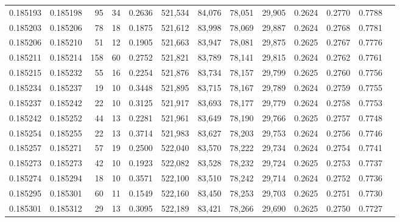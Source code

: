 \begin{tabular}{rrrrrrrrrrrrr}
0.185193 & 0.185198 &    95 &  34 &                                     0.2636 & 521,534 &  84,076 &  78,051 &  29,905 & 0.2624 & 0.2770 & 0.7788 \\
0.185203 & 0.185206 &    78 &  18 &                                     0.1875 & 521,612 &  83,998 &  78,069 &  29,887 & 0.2624 & 0.2768 & 0.7781 \\
0.185206 & 0.185210 &    51 &  12 &                                     0.1905 & 521,663 &  83,947 &  78,081 &  29,875 & 0.2625 & 0.2767 & 0.7776 \\
0.185211 & 0.185214 &   158 &  60 &                                     0.2752 & 521,821 &  83,789 &  78,141 &  29,815 & 0.2624 & 0.2762 & 0.7761 \\
0.185215 & 0.185232 &    55 &  16 &                                     0.2254 & 521,876 &  83,734 &  78,157 &  29,799 & 0.2625 & 0.2760 & 0.7756 \\
0.185234 & 0.185237 &    19 &  10 &                                     0.3448 & 521,895 &  83,715 &  78,167 &  29,789 & 0.2624 & 0.2759 & 0.7755 \\
0.185237 & 0.185242 &    22 &  10 &                                     0.3125 & 521,917 &  83,693 &  78,177 &  29,779 & 0.2624 & 0.2758 & 0.7753 \\
0.185242 & 0.185252 &    44 &  13 &                                     0.2281 & 521,961 &  83,649 &  78,190 &  29,766 & 0.2625 & 0.2757 & 0.7748 \\
0.185254 & 0.185255 &    22 &  13 &                                     0.3714 & 521,983 &  83,627 &  78,203 &  29,753 & 0.2624 & 0.2756 & 0.7746 \\
0.185257 & 0.185271 &    57 &  19 &                                     0.2500 & 522,040 &  83,570 &  78,222 &  29,734 & 0.2624 & 0.2754 & 0.7741 \\
0.185273 & 0.185273 &    42 &  10 &                                     0.1923 & 522,082 &  83,528 &  78,232 &  29,724 & 0.2625 & 0.2753 & 0.7737 \\
0.185274 & 0.185294 &    18 &  10 &                                     0.3571 & 522,100 &  83,510 &  78,242 &  29,714 & 0.2624 & 0.2752 & 0.7736 \\
0.185295 & 0.185301 &    60 &  11 &                                     0.1549 & 522,160 &  83,450 &  78,253 &  29,703 & 0.2625 & 0.2751 & 0.7730 \\
0.185301 & 0.185312 &    29 &  13 &                                     0.3095 & 522,189 &  83,421 &  78,266 &  29,690 & 0.2625 & 0.2750 & 0.7727 \\

\end{tabular}
